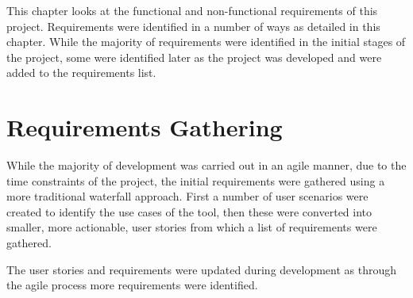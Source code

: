 \documentclass[l4proj.tex]{subfiles}
\begin{document}
    

This chapter looks at the functional and non-functional requirements of this project. Requirements were identified in a number of ways as detailed in this chapter. While the majority of requirements were identified in the initial stages of the project, some were identified later as the project was developed and were added to the requirements list.

\section{Requirements Gathering}
While the majority of development was carried out in an agile manner, due to the time constraints of the project, the initial requirements were gathered using a more traditional waterfall approach. First a number of user scenarios were created to identify the use cases of the tool, then these were converted into smaller, more actionable, user stories from which a list of requirements were gathered. 

The user stories and requirements were updated during development as through the agile process more requirements were identified.
 
\end{document}
